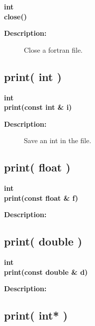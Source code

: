 \begin{flushleft} \textbf{%
int   \\ 
\settowidth{\FortranIOIncludeArgIndent}{close(}%
close()
}\end{flushleft}
\begin{description}
\item[{\bf Description:}] 
   Close a fortran file.
\end{description}
\subsection{print( int )}
 
\begin{flushleft} \textbf{%
int  \\ 
\settowidth{\FortranIOIncludeArgIndent}{print(}%
print(const int \& i)
}\end{flushleft}
\begin{description}
\item[{\bf Description:}] 
   Save an int in the file.
\end{description}
\subsection{print( float )}
 
\begin{flushleft} \textbf{%
int  \\ 
\settowidth{\FortranIOIncludeArgIndent}{print(}%
print(const float \& f)
}\end{flushleft}
\begin{description}
\item[{\bf Description:}] 
\end{description}
\subsection{print( double )}
 
\begin{flushleft} \textbf{%
int  \\ 
\settowidth{\FortranIOIncludeArgIndent}{print(}%
print(const double \& d)
}\end{flushleft}
\begin{description}
\item[{\bf Description:}] 
\end{description}
\subsection{print( int* )}
 

